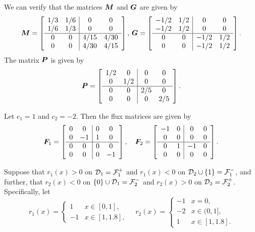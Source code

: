 We can verify that the matrices \(\boldsymbol M\) and \(\boldsymbol G\) are given by 
\[\boldsymbol M = \left[\begin{array}{cc|cc} 1/3 & 1/6 & 0 & 0 \\ 1/6 & 1/3 & 0 & 0 \\\hline 0 & 0 & 4/15 & 4/30 \\ 0 & 0 & 4/30 & 4/15 \end{array}\right],\, \boldsymbol G = \left[\begin{array}{cc|cc} -1/2 & 1/2 & 0 & 0 \\ -1/2 & 1/2 & 0 & 0 \\\hline 0 & 0 & -1/2 & 1/2 \\ 0 & 0 & -1/2 & 1/2 \end{array}\right].\] 
The matrix \(\boldsymbol P\) is given by 
\[\boldsymbol P = \left[\begin{array}{cc|cc} 1/2 & 0 & 0 & 0 \\ 0 & 1/2 & 0 & 0 \\\hline 0 & 0 & 2/5 & 0 \\ 0 & 0 & 0 & 2/5 \end{array}\right].\]

Let \(c_1=1\) and \(c_2=-2\). Then the flux matrices are given by 
\[\boldsymbol F_1 = \left[\begin{array}{cc|cc} 0 & 0 & 0 & 0 \\ 0 & -1 & 1 & 0 \\\hline 0 & 0 & 0 & 0 \\ 0 & 0 & 0 & -1 \end{array}\right],\quad \boldsymbol F_2 = \left[\begin{array}{cc|cc} -1 & 0 & 0 & 0 \\ 0 & 0 & 0 & 0 \\\hline 0 & 1 & -1 & 0 \\ 0 & 0 & 0 & 0 \end{array}\right].\]

Suppose that \(r_1(x)>0\) on \(\mathcal{D}_1=\mathcal F_1^+\) and \(r_1(x)<0\) on \(\mathcal{D}_2\cup\{1\}=\mathcal F_1^-\), and further, that \(r_2(x)<0\) on \(\{0\}\cup\mathcal{D}_1=\mathcal F_2^-\) and \(r_2(x)>0\) on \(\mathcal{D}_2=\mathcal F_2^+\). Specifically, let 
\[r_1(x) = \begin{cases} 1 & x \in [0,1], \\ -1 & x \in [1,1.8],\end{cases}\quad r_2(x) = \begin{cases} -1 & x = 0, \\ -2 & x \in (0,1], \\ 1 & x \in [1,1.8]. \end{cases}\]

